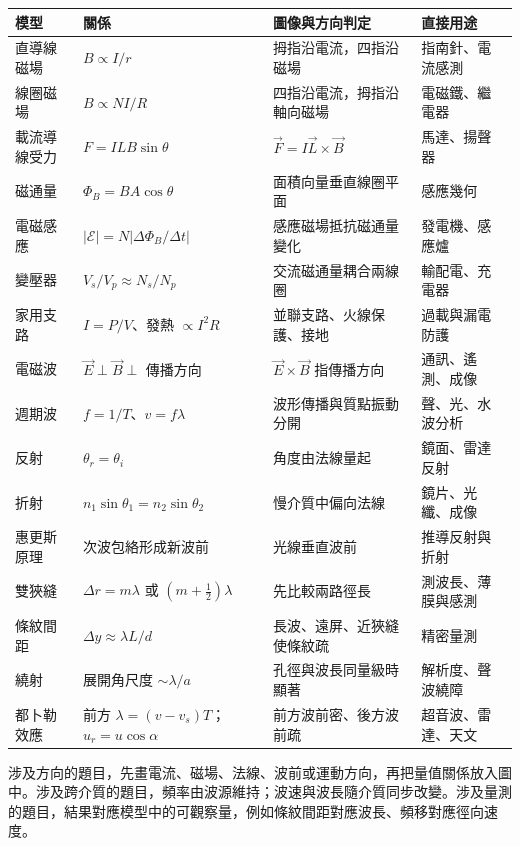 \documentclass[11pt,a4paper]{article}
\newcounter{none}
\begin{document}
{\def\LTcaptype{none} %
\begin{longtable}[]{@{}
  >{\raggedright\arraybackslash}p{}
  >{\raggedright\arraybackslash}p{}
  >{\raggedright\arraybackslash}p{}
  >{\raggedright\arraybackslash}p{}@{}}
\toprule\noalign{}
\begin{minipage}[b]{\linewidth}\raggedright
模型
\end{minipage} & \begin{minipage}[b]{\linewidth}\raggedright
關係
\end{minipage} & \begin{minipage}[b]{\linewidth}\raggedright
圖像與方向判定
\end{minipage} & \begin{minipage}[b]{\linewidth}\raggedright
直接用途
\end{minipage} \\
\midrule\noalign{}
\endhead
\bottomrule\noalign{}
\endlastfoot
直導線磁場 & \(B\propto I/r\) & 拇指沿電流，四指沿磁場 & 指南針、電流感測 \\
線圈磁場 & \(B\propto NI/R\) & 四指沿電流，拇指沿軸向磁場 & 電磁鐵、繼電器 \\
載流導線受力 & \(F=ILB\sin\theta\) & \(\vec F=I\vec L\times\vec B\) & 馬達、揚聲器 \\
磁通量 & \(\Phi_B=BA\cos\theta\) & 面積向量垂直線圈平面 & 感應幾何 \\
電磁感應 & \(|\mathcal E|=N|\Delta\Phi_B/\Delta t|\) & 感應磁場抵抗磁通量變化 & 發電機、感應爐 \\
變壓器 & \(V_s/V_p\approx N_s/N_p\) & 交流磁通量耦合兩線圈 & 輸配電、充電器 \\
家用支路 & \(I=P/V\)、發熱 \(\propto I^2R\) & 並聯支路、火線保護、接地 & 過載與漏電防護 \\
電磁波 & \(\vec E\perp\vec B\perp\) 傳播方向 & \(\vec E\times\vec B\) 指傳播方向 & 通訊、遙測、成像 \\
週期波 & \(f=1/T\)、\(v=f\lambda\) & 波形傳播與質點振動分開 & 聲、光、水波分析 \\
反射 & \(\theta_r=\theta_i\) & 角度由法線量起 & 鏡面、雷達反射 \\
折射 & \(n_1\sin\theta_1=n_2\sin\theta_2\) & 慢介質中偏向法線 & 鏡片、光纖、成像 \\
惠更斯原理 & 次波包絡形成新波前 & 光線垂直波前 & 推導反射與折射 \\
雙狹縫 & \(\Delta r=m\lambda\) 或 \((m+\tfrac12)\lambda\) & 先比較兩路徑長 & 測波長、薄膜與感測 \\
條紋間距 & \(\Delta y\approx\lambda L/d\) & 長波、遠屏、近狹縫使條紋疏 & 精密量測 \\
繞射 & 展開角尺度 \(\sim\lambda/a\) & 孔徑與波長同量級時顯著 & 解析度、聲波繞障 \\
都卜勒效應 & 前方 \(\lambda=(v-v_s)T\)；\(u_r=u\cos\alpha\) & 前方波前密、後方波前疏 & 超音波、雷達、天文 \\
\end{longtable}
}

涉及方向的題目，先畫電流、磁場、法線、波前或運動方向，再把量值關係放入圖中。涉及跨介質的題目，頻率由波源維持；波速與波長隨介質同步改變。涉及量測的題目，結果對應模型中的可觀察量，例如條紋間距對應波長、頻移對應徑向速度。
\end{document}
